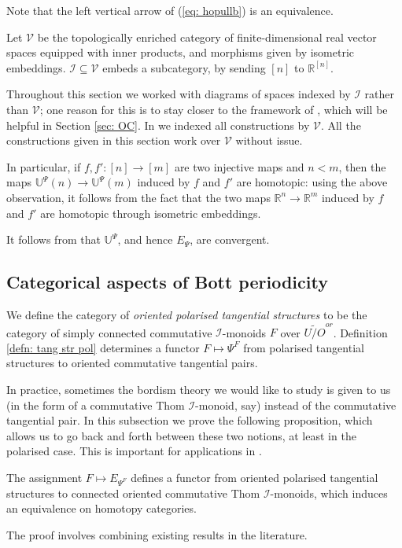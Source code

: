 \documentclass{TPmod}
\def\bR{\mathbb{R}}
\def\bU{\mathbb{U}}
\newcommand{\cI}{\mathcal{I}}
\newcommand{\cV}{\mathcal{V}}
\numberwithin{equation}{section}
\begin{document}
    Note that the left vertical arrow of (\ref{eq: hopullb}) is an equivalence. 
    \begin{rmk}\label{rmk: I V}
        Let $\cV$ be the topologically enriched category of finite-dimensional real vector spaces equipped with inner products, and morphisms given by isometric embeddings. $\cI \subseteq \cV$ embeds a subcategory, by sending $[n]$ to $\bR^{[n]}$. 
    
        Throughout this section we worked with diagrams of spaces indexed by $\cI$ rather than $\cV$; one reason for this is to stay closer to the framework of \cite{Schlichtkrull}, which will be helpful in Section \ref{sec: OC}. In \cite{PS2} we indexed all constructions by $\cV$. All the constructions given in this section work over $\cV$ without issue.

        In particular, if $f,f': [n] \to [m]$ are two injective maps and $n<m$, then the maps $\bU^\Psi(n) \to \bU^\Psi(m)$ induced by $f$ and $f'$ are homotopic: using the above observation, it follows from the fact that the two maps $\bR^n \to \bR^m$ induced by $f$ and $f'$ are homotopic through isometric embeddings.
    \end{rmk}
    \begin{rmk}
        It follows from \cite[Lemma 3.24]{PS2} that $\bU^\Psi$, and hence $E_\Psi$, are convergent.
    \end{rmk}

\subsection{Categorical aspects of Bott periodicity}\label{sec: cat asp bott}
    

    We define the category of \emph{oriented polarised tangential structures} to be the category of simply connected commutative $\cI$-monoids $F$ over $\widetilde{U/O}^{or}$.  Definition \ref{defn: tang str pol} determines a functor $F \mapsto \Psi^F$ from polarised tangential structures to oriented commutative tangential pairs.

    In practice, sometimes the bordism theory we would like to study is given to us (in the form of a commutative Thom $\cI$-monoid, say) instead of the commutative tangential pair. In this subsection we prove the following proposition, which allows us to go back and forth between these two notions, at least in the polarised case. This is important for applications in \cite{PS4}.
    

    \begin{prop}\label{prop: mode baas sull}

        The assignment $F \mapsto E_{\Psi^F}$ defines a functor from oriented polarised tangential structures to connected oriented commutative Thom $\cI$-monoids, which induces an equivalence on homotopy categories.
    \end{prop}
    The proof involves combining existing results in the literature.
\end{document}
